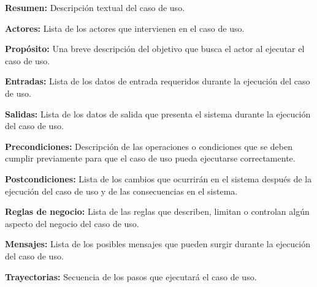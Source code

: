 \documentclass[12pt]{book}
\begin{document}
\begin{objetivos}
	\item {\bf Resumen:} Descripción textual del caso de uso.
	\item {\bf Actores:} Lista de los actores que intervienen en el caso de uso.
	\item {\bf Propósito:} Una breve descripción del objetivo que busca el actor al ejecutar el caso de uso.
	\item {\bf Entradas:} Lista de los datos de entrada requeridos durante la ejecución del caso de uso.
	\item {\bf Salidas:} Lista de los datos de salida que presenta el sistema durante la ejecución del caso de uso.
	\item {\bf Precondiciones:} Descripción de las operaciones o condiciones que se deben cumplir previamente para que el caso de uso pueda ejecutarse correctamente.
	\item {\bf Postcondiciones:} Lista de los cambios que ocurrirán en el sistema después de la ejecución del caso de uso y de las consecuencias en el sistema.
	\item {\bf Reglas de negocio:} Lista de las reglas que describen, limitan o controlan algún aspecto del negocio del caso de uso.
	\item {\bf Mensajes:} Lista de los posibles mensajes que pueden surgir durante la ejecución del caso de uso.
	\item {\bf Trayectorias:} Secuencia de los pasos que ejecutará el caso de uso.
\end{objetivos}

\end{document}
